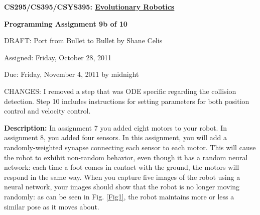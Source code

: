 \documentclass[12pt]{article}
\begin{document}
\centerline{\bf \Large CS295/CS395/CSYS395: \href{CS295_395_Syllabus.pdf}{\underline{Evolutionary Robotics}}}

\vspace{0.5cm}

\centerline{\bf \large Programming Assignment 9b of 10}
\vspace{0.25cm} \centerline{\color{red}DRAFT: Port from Bullet to Bullet by Shane Celis \color{black}}
\vspace{0.5cm}

\centerline{\large Assigned: Friday, October 28, 2011}

\vspace{0.5cm}

\centerline{\large Due: Friday, November 4, 2011 by midnight}

\vspace{0.5cm}
\noindent \color{red}CHANGES:  I removed a step that was ODE specific regarding the collision detection.  Step 10 includes instructions for setting parameters for both position control and velocity control.  \color{black}

\noindent \textbf{Description:} In assignment 7 you added eight motors to your robot. In assignment 8, you added four sensors. In this assignment, you will add a randomly-weighted synapse connecting each sensor to each motor. This will cause the robot to exhibit non-random behavior, even though it has a random neural network: each time a foot comes in contact with the ground, the motors will respond in the same way. When you capture five images of the robot using a neural network, your images should show that the robot is no longer moving randomly: as can be seen in Fig. \ref{Fig1}, the robot maintains more or less a similar pose as it moves about.
\end{document}
